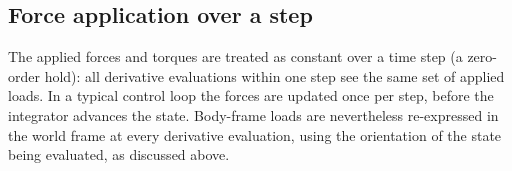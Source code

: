 \documentclass{article}
\begin{document}
\subsection{Force application over a step}

The applied forces and torques are treated as constant over a time step (a zero-order hold): all derivative evaluations within one step see the same set of applied loads. In a typical control loop the forces are updated once per step, before the integrator advances the state. Body-frame loads are nevertheless re-expressed in the world frame at every derivative evaluation, using the orientation of the state being evaluated, as discussed above.

	
\end{document}
